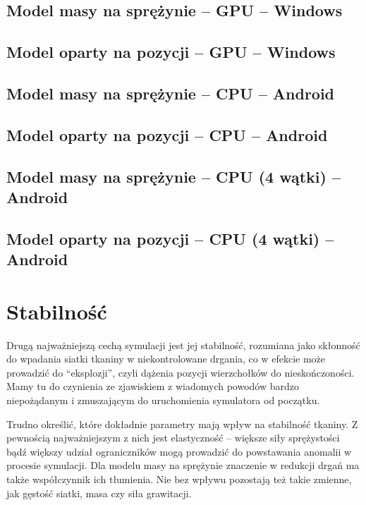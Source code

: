 		
		\subsection{Model masy na sprężynie -- GPU -- Windows}
		\label{t:wyniki:czas_wykonania:ms_gpu_pc}
		
		
		\subsection{Model oparty na pozycji -- GPU -- Windows}
		\label{t:wyniki:czas_wykonania:pb_gpu_pc}
		
		
		\subsection{Model masy na sprężynie -- CPU -- Android}
		\label{t:wyniki:czas_wykonania:ms_cpu_andro}
		
		
		\subsection{Model oparty na pozycji -- CPU -- Android}
		\label{t:wyniki:czas_wykonania:pb_cpu_andro}
		
		
		\subsection{Model masy na sprężynie -- CPU (4 wątki) -- Android}
		\label{t:wyniki:czas_wykonania:ms_cpux4_andro}
		
		
		\subsection{Model oparty na pozycji -- CPU (4 wątki) -- Android}
		\label{t:wyniki:czas_wykonania:pb_cpux4_andro}
		
	
	\section{Stabilność}
	\label{t:wyniki:stabilnosc}
	
		Drugą najważniejszą cechą symulacji jest jej stabilność, rozumiana jako skłonność do wpadania siatki tkaniny w niekontrolowane drgania, co w efekcie może prowadzić do ``eksplozji'', czyli dążenia pozycji wierzchołków do nieskończoności. Mamy tu do czynienia ze zjawiskiem z wiadomych powodów bardzo niepożądanym i zmuszającym do uruchomienia symulatora od początku.
		
		Trudno określić, które dokładnie parametry mają wpływ na stabilność tkaniny. Z pewnością najważniejszym z nich jest elastyczność -- większe siły sprężystości bądź większy udział ograniczników mogą prowadzić do powstawania anomalii w procesie symulacji. Dla modelu masy na sprężynie znaczenie w redukcji drgań ma także współczynnik ich tłumienia. Nie bez wpływu pozostają też takie zmienne, jak gęstość siatki, masa czy siła grawitacji.
		
